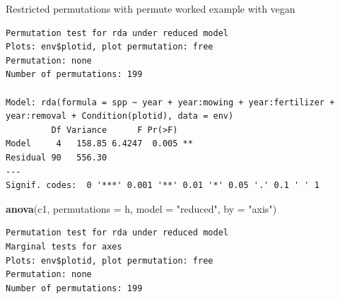 \documentclass[10pt,ignorenonframetext,compress, aspectratio=169]{beamer}
\newenvironment{Shaded}{\begin{snugshade}}{\end{snugshade}}
\newcommand{\KeywordTok}[1]{\textcolor[rgb]{0.13,0.29,0.53}{\textbf{{#1}}}}
\newcommand{\DataTypeTok}[1]{\textcolor[rgb]{0.13,0.29,0.53}{{#1}}}
\newcommand{\DecValTok}[1]{\textcolor[rgb]{0.00,0.00,0.81}{{#1}}}
\newcommand{\StringTok}[1]{\textcolor[rgb]{0.31,0.60,0.02}{{#1}}}
\newcommand{\NormalTok}[1]{{#1}}
\begin{document}
\begin{frame}[fragile]{Restricted permutations with permute \textbar{}
worked example with vegan}

\tiny

\begin{Shaded}
\end{Shaded}

\begin{verbatim}
Permutation test for rda under reduced model
Plots: env$plotid, plot permutation: free
Permutation: none
Number of permutations: 199

Model: rda(formula = spp ~ year + year:mowing + year:fertilizer + year:removal + Condition(plotid), data = env)
         Df Variance      F Pr(>F)   
Model     4   158.85 6.4247  0.005 **
Residual 90   556.30                 
---
Signif. codes:  0 '***' 0.001 '**' 0.01 '*' 0.05 '.' 0.1 ' ' 1
\end{verbatim}

\begin{Shaded}
\begin{Highlighting}[]
\KeywordTok{anova}\NormalTok{(c1, }\DataTypeTok{permutations =} \NormalTok{h, }\DataTypeTok{model =} \StringTok{"reduced"}\NormalTok{, }\DataTypeTok{by =} \StringTok{"axis"}\NormalTok{)}
\end{Highlighting}
\end{Shaded}

\begin{verbatim}
Permutation test for rda under reduced model
Marginal tests for axes
Plots: env$plotid, plot permutation: free
Permutation: none
Number of permutations: 199


\end{verbatim}
\end{frame}
\end{document}
